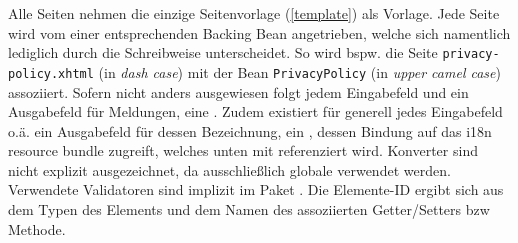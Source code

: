\documentclass{article}
\begin{document}
\long{}

\long{}

\newcommand{\component}[2]{\subsubsection{#1 (\texttt{#2})}}

\newcommand{\BTN}{\tag{h}{commandButton}}
\newcommand{\LNK}{\tag{h}{outputLink}}
\newcommand{\INP}{\tag{h}{inputText}}
\newcommand{\PAS}{\tag{h}{inputSecret}}
\newcommand{\DRP}{\tag{h}{selectOneMenu}}
\newcommand{\CHK}{\tag{h}{selectBooleanCheckbox}}
\newcommand{\OUT}{\tag{h}{outputText}}
\newcommand{\LST}{\tag{bibi}{paginatedList}}
\newcommand{\TXT}{\tag{h}{inputTextarea}}
\newcommand{\PRM}{\tag{f}{viewParam}}
\newcommand{\FRM}{\tag{h}{form}}

Alle Seiten nehmen die einzige Seitenvorlage (\ref{template}) als Vorlage.
Jede Seite wird vom einer entsprechenden Backing Bean angetrieben, welche sich namentlich lediglich durch die Schreibweise unterscheidet. So wird bspw. die Seite \texttt{privacy-policy.xhtml} (in \textit{dash case}) mit der Bean \texttt{PrivacyPolicy} (in \textit{upper camel case}) assoziiert.
Sofern nicht anders ausgewiesen folgt jedem Eingabefeld und \PAS ein Ausgabefeld für Meldungen, eine .
Zudem existiert für generell jedes Eingabefeld o.ä. ein Ausgabefeld für dessen Bezeichnung, ein , dessen Bindung
auf das i18n resource bundle zugreift, welches unten mit  referenziert wird.
Konverter sind nicht explizit ausgezeichnet, da ausschließlich globale verwendet werden.
Verwendete Validatoren sind implizit im Paket .
Die Elemente-ID ergibt sich aus dem Typen des Elements und dem Namen des assoziierten Getter/Setters bzw Methode.
\end{document}
